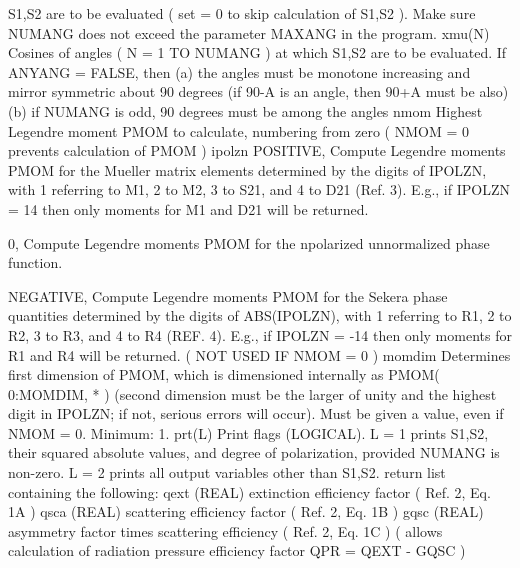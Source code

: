 \begin{DoxyVerb}
            S1,S2 are to be evaluated  ( set = 0 to skip
            calculation of S1,S2 ).  Make sure NUMANG does
            not exceed the parameter MAXANG in the program.
    xmu(N)  Cosines of angles ( N = 1 TO NUMANG ) at which S1,S2
            are to be evaluated.  If ANYANG = FALSE, then
             (a) the angles must be monotone increasing and
             mirror symmetric about 90 degrees (if 90-A is
             an angle, then 90+A must be also)
             (b) if NUMANG is odd, 90 degrees must be among
             the angles
    nmom     Highest Legendre moment PMOM to calculate,
             numbering from zero ( NMOM = 0 prevents
             calculation of PMOM )
    ipolzn   POSITIVE, Compute Legendre moments PMOM for the
                 Mueller matrix elements determined by the
                 digits of IPOLZN, with 1 referring to M1,
                 2 to M2, 3 to S21, and 4 to D21 (Ref. 3).
                 E.g., if IPOLZN = 14 then only moments for
                 M1 and D21 will be returned.

             0,  Compute Legendre moments PMOM for the
                 npolarized unnormalized phase function.

             NEGATIVE, Compute Legendre moments PMOM for the
                 Sekera phase quantities determined by the
                 digits of ABS(IPOLZN), with 1 referring to
                 R1, 2 to R2, 3 to R3, and 4 to R4 (REF. 4).
                 E.g., if IPOLZN = -14 then only moments for
                 R1 and R4 will be returned.
             ( NOT USED IF  NMOM = 0 )
    momdim   Determines first dimension of PMOM, which is dimensioned
             internally as PMOM( 0:MOMDIM, * ) (second dimension must
             be the larger of unity and the highest digit in
             IPOLZN; if not, serious errors will occur).
             Must be given a value, even if  NMOM = 0.  Minimum: 1.
    prt(L)   Print flags (LOGICAL).  L = 1  prints  S1,S2, their
             squared absolute values, and degree of polarization,
             provided NUMANG is non-zero.   L = 2  prints all
             output variables other than  S1,S2.
return list containing the following:
    qext       (REAL) extinction efficiency factor  ( Ref. 2, Eq. 1A )
    qsca       (REAL) scattering efficiency factor  ( Ref. 2, Eq. 1B )
    gqsc       (REAL) asymmetry factor times scattering efficiency
               ( Ref. 2, Eq. 1C )  ( allows calculation of radiation
               pressure efficiency factor  QPR = QEXT - GQSC )


\end{DoxyVerb}
